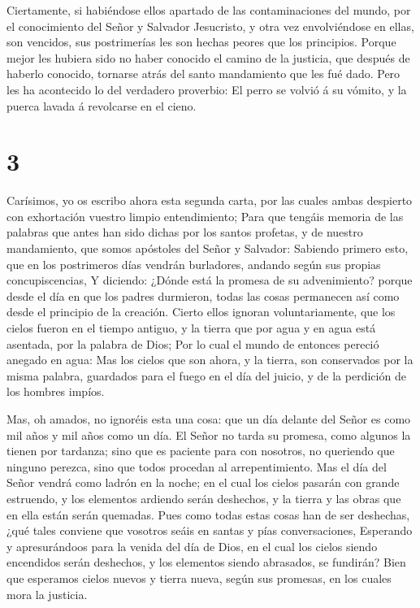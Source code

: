  Ciertamente, si habiéndose ellos apartado de las
contaminaciones del mundo, por el conocimiento del Señor y Salvador
Jesucristo, y otra vez envolviéndose en ellas, son vencidos, sus
postrimerías les son hechas peores que los principios. 
Porque mejor les hubiera sido no haber conocido el camino de la
justicia, que después de haberlo conocido, tornarse atrás del santo
mandamiento que les fué dado.  Pero les ha acontecido lo
del verdadero proverbio: El perro se volvió á su vómito, y la puerca
lavada á revolcarse en el cieno.

\hypertarget{section-2}{%
\section{3}\label{section-2}}

 Carísimos, yo os escribo ahora esta segunda carta, por las
cuales ambas despierto con exhortación vuestro limpio entendimiento;
 Para que tengáis memoria de las palabras que antes han sido
dichas por los santos profetas, y de nuestro mandamiento, que somos
apóstoles del Señor y Salvador:  Sabiendo primero esto, que
en los postrimeros días vendrán burladores, andando según sus propias
concupiscencias,  Y diciendo: ¿Dónde está la promesa de su
advenimiento? porque desde el día en que los padres durmieron, todas las
cosas permanecen así como desde el principio de la creación.
 Cierto ellos ignoran voluntariamente, que los cielos fueron
en el tiempo antiguo, y la tierra que por agua y en agua está asentada,
por la palabra de Dios;  Por lo cual el mundo de entonces
pereció anegado en agua:  Mas los cielos que son ahora, y la
tierra, son conservados por la misma palabra, guardados para el fuego en
el día del juicio, y de la perdición de los hombres impíos.

 Mas, oh amados, no ignoréis esta una cosa: que un día
delante del Señor es como mil años y mil años como un día. 
El Señor no tarda su promesa, como algunos la tienen por tardanza; sino
que es paciente para con nosotros, no queriendo que ninguno perezca,
sino que todos procedan al arrepentimiento.  Mas el día del
Señor vendrá como ladrón en la noche; en el cual los cielos pasarán con
grande estruendo, y los elementos ardiendo serán deshechos, y la tierra
y las obras que en ella están serán quemadas.  Pues como
todas estas cosas han de ser deshechas, ¿qué tales conviene que vosotros
seáis en santas y pías conversaciones,  Esperando y
apresurándoos para la venida del día de Dios, en el cual los cielos
siendo encendidos serán deshechos, y los elementos siendo abrasados, se
fundirán?  Bien que esperamos cielos nuevos y tierra nueva,
según sus promesas, en los cuales mora la justicia.

